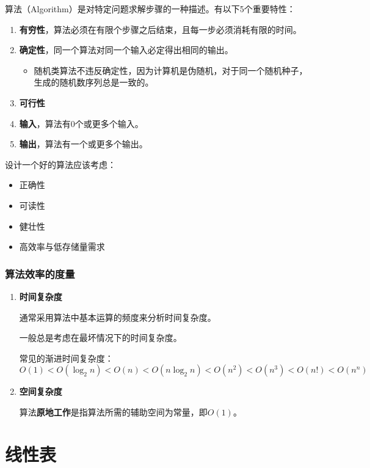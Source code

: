 \documentclass[12pt, a4paper, oneside]{ctexart}
\begin{document}
算法（Algorithm）是对特定问题求解步骤的一种描述。有以下5个重要特性：
\begin{enumerate}
  \item {\bf 有穷性}，算法必须在有限个步骤之后结束，且每一步必须消耗有限的时间。
  \item {\bf 确定性}，同一个算法对同一个输入必定得出相同的输出。
  \begin{itemize}
    \item 随机类算法不违反确定性，因为计算机是伪随机，对于同一个随机种子，生成的随机数序列总是一致的。
  \end{itemize}
  \item {\bf 可行性}
  \item {\bf 输入}，算法有0个或更多个输入。
  \item {\bf 输出}，算法有一个或更多个输出。
\end{enumerate}

设计一个好的算法应该考虑：
\begin{itemize}
  \item 正确性
  \item 可读性
  \item 健壮性
  \item 高效率与低存储量需求
\end{itemize}

\subsubsection{算法效率的度量}

\begin{enumerate}
  \item {\bf 时间复杂度}
  
  通常采用算法中基本运算的频度来分析时间复杂度。

  一般总是考虑在最坏情况下的时间复杂度。

  常见的渐进时间复杂度：
  \begin{equation*}
    O(1)<O(\log_2 n)<O(n)<O(n\log_2 n)<O(n^2)<O(n^3)<O(n!)<O(n^n)
  \end{equation*}
  \item {\bf 空间复杂度}
  
  算法\textbf{原地工作}是指算法所需的辅助空间为常量，即$O(1)$。
\end{enumerate}

\section{线性表}
\end{document}
